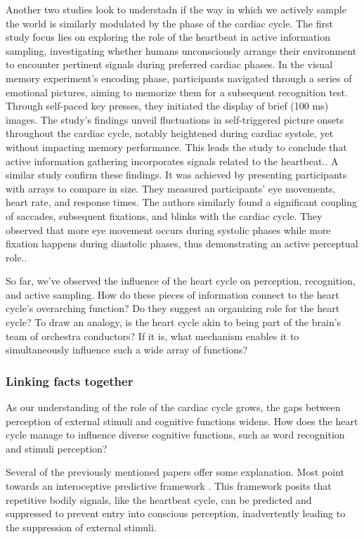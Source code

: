 \documentclass[12pt,oneside,openright]{report}
\begin{document}
Another two studies look to understadn if the way in which we actively sample the world is similarly modulated by the phase of the cardiac cycle. The first study focus lies on exploring the role of the heartbeat in active information sampling, investigating whether humans unconsciously arrange their environment to encounter pertinent signals during preferred cardiac phases. In the visual memory experiment's encoding phase, participants navigated through a series of emotional pictures, aiming to memorize them for a subsequent recognition test. Through self-paced key presses, they initiated the display of brief (100 ms) images. The study's findings unveil fluctuations in self-triggered picture onsets throughout the cardiac cycle, notably heightened during cardiac systole, yet without impacting memory performance. This leads the study to conclude that active information gathering incorporates signals related to the heartbeat.\parencite{Kunzendorf2019-vz}. A similar study confirm these findings. It was achieved by presenting participants with arrays to compare in size. They measured participants' eye movements, heart rate, and response times. The authors similarly found a significant coupling of saccades, subsequent fixations, and blinks with the cardiac cycle. They observed that more eye movement occurs during systolic phases while more fixation happens during diastolic phases, thus demonstrating an active perceptual role.\parencite{GalvezPol2018ActiveSI}.

So far, we've observed the influence of the heart cycle on perception, recognition, and active sampling. How do these pieces of information connect to the heart cycle's overarching function? Do they suggest an organizing role for the heart cycle? To draw an analogy, is the heart cycle akin to being part of the brain's team of orchestra conductors? If it is, what mechanism enables it to simultaneously influence such a wide array of functions?

\subsubsection*{Linking facts together}

As our understanding of the role of the cardiac cycle grows, the gaps between perception of external stimuli and cognitive functions widens. How does the heart cycle manage to influence diverse cognitive functions, such as word recognition and stimuli perception?

Several of the previously mentioned papers offer some explanation. Most point towards an interoceptive predictive framework . This framework posits that repetitive bodily signals, like the heartbeat cycle, can be predicted and suppressed to prevent entry into conscious perception, inadvertently leading to the suppression of external stimuli\parencite{AL2021118247, SALTAFOSSI2023108642}. 
\end{document}
